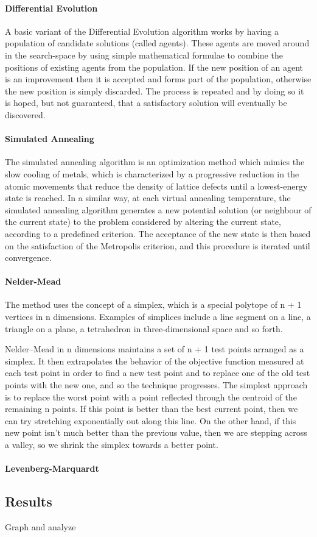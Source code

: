 \documentclass{article}
\begin{document}
\paragraph{Differential Evolution}

A basic variant of the Differential Evolution  algorithm works by having a population of candidate solutions (called agents). These agents are moved around in the search-space by using simple mathematical formulae to combine the positions of existing agents from the population. If the new position of an agent is an improvement then it is accepted and forms part of the population, otherwise the new position is simply discarded. The process is repeated and by doing so it is hoped, but not guaranteed, that a satisfactory solution will eventually be discovered.

\paragraph{Simulated Annealing}

The simulated annealing algorithm is an optimization method which mimics the slow cooling of metals, which is characterized by a progressive reduction in the atomic movements that reduce the density of lattice defects until a lowest-energy state is reached. In a similar way, at each virtual annealing temperature, the simulated annealing algorithm generates a new potential solution (or neighbour of the current state) to the problem considered by altering the current state, according to a predefined criterion. The acceptance of the new state is then based on the satisfaction of the Metropolis criterion, and this procedure is iterated until convergence.

\paragraph{Nelder-Mead}

The method uses the concept of a simplex, which is a special polytope of n + 1 vertices in n dimensions. Examples of simplices include a line segment on a line, a triangle on a plane, a tetrahedron in three-dimensional space and so forth.

Nelder–Mead in n dimensions maintains a set of n + 1 test points arranged as a simplex. It then extrapolates the behavior of the objective function measured at each test point in order to find a new test point and to replace one of the old test points with the new one, and so the technique progresses. The simplest approach is to replace the worst point with a point reflected through the centroid of the remaining n points. If this point is better than the best current point, then we can try stretching exponentially out along this line. On the other hand, if this new point isn't much better than the previous value, then we are stepping across a valley, so we shrink the simplex towards a better point.

\paragraph{Levenberg-Marquardt}


\subsection*{Results}

Graph and analyze
\end{document}
